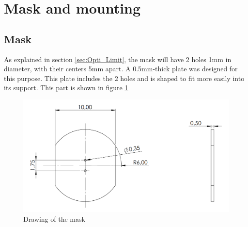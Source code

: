 \section{Mask and mounting}\label{sec:mask}
\subsection{Mask}
As explained in section \ref{sec:Opti_Limit}, the mask will have 2 holes 1mm in diameter, with their centers 5mm apart. 
A 0.5mm-thick plate was designed for this purpose. This plate includes the 2 holes and is shaped to fit more easily into its support.
This part is shown in figure \ref{fig:Mec_Mask}
\begin{figure}[H]
    \centering
    \includegraphics[scale=0.55]{assets/figures/Mechanical Design/Dessin_Mask.png}
    \caption{Drawing of the mask}
    \label{fig:Mec_Mask}
\end{figure}

